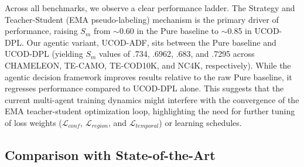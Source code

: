 \documentclass[journal,twoside,web]{IEEEtran}
\newcommand{\methodname}{UCOD-ADF}
\begin{document}
Across all benchmarks, we observe a clear performance ladder. The Strategy and Teacher-Student (EMA pseudo-labeling) mechanism is the primary driver of performance, raising $S_m$ from $\sim$0.60 in the Pure baseline to $\sim$0.85 in UCOD-DPL. Our agentic variant, \methodname{}, sits between the Pure baseline and UCOD-DPL (yielding $S_m$ values of .734, .6962, .683, and .7295 across CHAMELEON, TE-CAMO, TE-COD10K, and NC4K, respectively). While the agentic decision framework improves results relative to the raw Pure baseline, it regresses performance compared to UCOD-DPL alone. This suggests that the current multi-agent training dynamics might interfere with the convergence of the EMA teacher-student optimization loop, highlighting the need for further tuning of loss weights ($\mathcal{L}_{conf}$, $\mathcal{L}_{region}$, and $\mathcal{L}_{temporal}$) or learning schedules.

\subsection{Comparison with State-of-the-Art}
\end{document}
